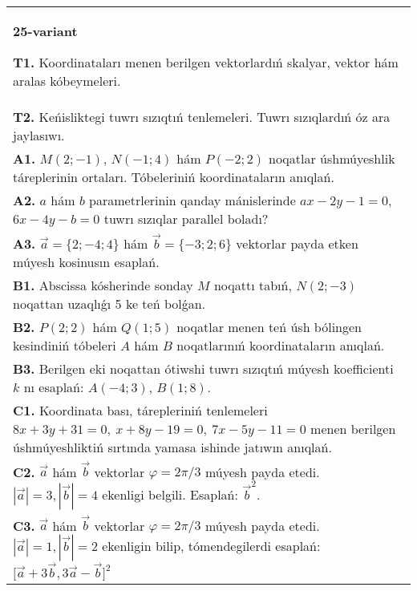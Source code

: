 \documentclass{article}
\begin{document}
\begin{tabular}{m{17cm}}
\textbf{25-variant}

\textbf{T1.} 
Koordinataları menen berilgen vektorlardıń skalyar, vektor hám aralas kóbeymeleri.
 \\
\textbf{T2.} 
Keńisliktegi tuwrı sızıqtıń tenlemeleri. Tuwrı sızıqlardıń óz ara jaylasıwı.
 \\
\textbf{A1.} 
$M (2;-1) $, $N (-1;4) $ hám $P (-2;2) $ noqatlar
úshmúyeshlik táreplerinin ortaları. Tóbeleriniń koordinataların
anıqlań.
 \\
\textbf{A2.} 
$a$ hám $b$ parametrlerinin qanday mánislerinde
$ax-2y-1=0$, $6x-4y-b=0$ tuwrı sızıqlar parallel boladı?
 \\
\textbf{A3.} 
$\overrightarrow{a} = \{ 2; - 4;4\}$ hám $\overrightarrow{b} = \{ - 3;2;6\}$
vektorlar payda etken múyesh kosinusın esaplań.
 \\
\textbf{B1.} 
Abscissa kósherinde sonday $M$ noqattı tabıń,
\(N (2;-3) \) noqattan uzaqlıǵı 5 ke teń bolǵan.
 \\
\textbf{B2.} 
\(P (2;2) \) hám \(Q (1;5) \) noqatlar menen teń úsh
bólingen kesindiniń tóbeleri $A$ hám $B$ noqatlarınıń
koordinataların anıqlań.
 \\
\textbf{B3.} 
Berilgen eki noqattan ótiwshi tuwrı sızıqtıń múyesh
koefficienti $k$ nı esaplań: $A (-4;3) $, $B (1;8) $.
 \\
\textbf{C1.} 
Koordinata bası, tárepleriniń tenlemeleri
\(8x+3y+31=0,\ x+8y-19=0,\ 7x-5y-11=0\) menen
berilgen úshmúyeshliktiń sırtında yamasa ishinde jatıwın anıqlań.
 \\
\textbf{C2.} 
$\vec{a}$ hám $\vec{b}$ vektorlar $\varphi = 2\pi/3$ múyesh payda etedi. $|\vec{a}| = 3,|\vec{b}| = 4$ ekenligi belgili. Esaplań:
${\vec{b}}^{2}$.
 \\
\textbf{C3.} 
$\vec{a}$ hám $\vec{b}$ vektorlar $\varphi = 2\pi/3$ múyesh payda etedi. $|\vec{a}| = 1,|\vec{b}| = 2$ ekenligin bilip, tómendegilerdi esaplań:
$\lbrack\overrightarrow{a} + 3\overrightarrow{b},3\overrightarrow{a} - \overrightarrow{b}\rbrack^{2}$
 \\

\end{tabular}
\vspace{1cm}
\end{document}
